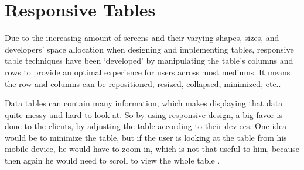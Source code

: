 %
%
%
%
%
\chapter{Responsive Tables}

Due to the increasing amount of screens and their varying shapes, sizes,
and developers' space allocation when designing and implementing tables,
responsive table techniques have been `developed' by manipulating the table's
columns and rows to provide an optimal experience for users across most mediums. It means the row and
columns can be repositioned,
resized, collapsed, minimized, etc..

Data tables can contain many information, which makes displaying that data quite messy and hard to
look at. So by using responsive design, a big favor is done to the clients,
by adjusting the table according to their devices. One idea would be to minimize the table, but if the user is looking
at the table from his mobile device, he would have to zoom in, which is not that useful to him, because then again he would need to scroll
to view the whole table \parencite{Alligator}.

